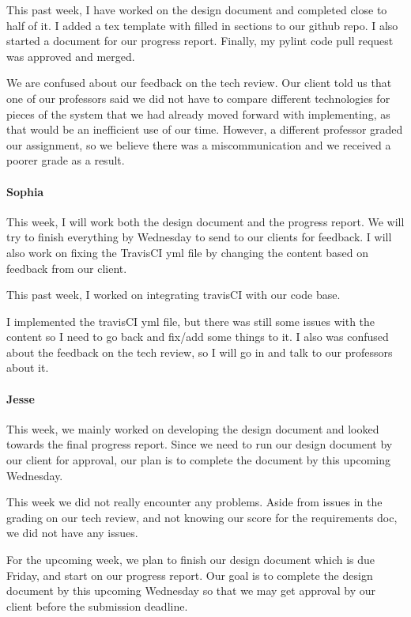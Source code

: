 \documentclass[onecolumn, draftclsnofoot,10pt, compsoc]{IEEEtran}
\begin{document}
\begin{flushleft}
 
This past week, I have worked on the design document and completed close to half of it. I added a tex template with filled in sections to our github repo. I also started a document for our progress report. Finally, my pylint code pull request was approved and merged.
 
 
We are confused about our feedback on the tech review. Our client told us that one of our professors said we did not have to compare different technologies for pieces of the system that we had already moved forward with implementing, as that would be an inefficient use of our time. However, a different professor graded our assignment, so we believe there was a miscommunication and we received a poorer grade as a result.
 
\paragraph{Sophia}
 
This week, I will work both the design document and the progress report. We will try to finish everything by Wednesday to send to our clients for feedback. I will also work on fixing the TravisCI yml file by changing the content based on feedback from our client.
 
 
This past week, I worked on integrating travisCI with our code base.
 
 
I implemented the travisCI yml file, but there was still some issues with the content so I need to go back and fix/add some things to it. I also was confused about the feedback on the tech review, so I will go in and talk to our professors about it.
 
\paragraph{Jesse}
 
This week, we mainly worked on developing the design document and looked towards the final progress report. Since we need to run our design document by our client for approval, our plan is to complete the document by this upcoming Wednesday.
 
 
This week we did not really encounter any problems. Aside from issues in the grading on our tech review, and not knowing our score for the requirements doc, we did not have any issues.
 
 
For the upcoming week, we plan to finish our design document which is due Friday, and start on our progress report. Our goal is to complete the design document by this upcoming Wednesday so that we may get approval by our client before the submission deadline.
 

\end{flushleft}
\end{document}
